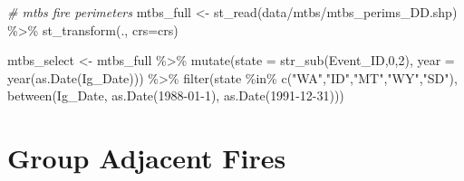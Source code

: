 \documentclass[
]{book}
\newenvironment{Shaded}{\begin{snugshade}}{\end{snugshade}}
\newcommand{\AttributeTok}[1]{\textcolor[rgb]{0.77,0.63,0.00}{#1}}
\newcommand{\CommentTok}[1]{\textcolor[rgb]{0.56,0.35,0.01}{\textit{#1}}}
\newcommand{\DecValTok}[1]{\textcolor[rgb]{0.00,0.00,0.81}{#1}}
\newcommand{\FunctionTok}[1]{\textcolor[rgb]{0.00,0.00,0.00}{#1}}
\newcommand{\NormalTok}[1]{#1}
\newcommand{\OtherTok}[1]{\textcolor[rgb]{0.56,0.35,0.01}{#1}}
\newcommand{\SpecialCharTok}[1]{\textcolor[rgb]{0.00,0.00,0.00}{#1}}
\newcommand{\StringTok}[1]{\textcolor[rgb]{0.31,0.60,0.02}{#1}}
\begin{document}
\begin{Shaded}
\begin{Highlighting}[]
\CommentTok{\# mtbs fire perimeters}
\NormalTok{mtbs\_full }\OtherTok{\textless{}{-}} \FunctionTok{st\_read}\NormalTok{(}\StringTok{\textquotesingle{}data/mtbs/mtbs\_perims\_DD.shp\textquotesingle{}}\NormalTok{) }\SpecialCharTok{\%\textgreater{}\%} 
  \FunctionTok{st\_transform}\NormalTok{(., }\AttributeTok{crs=}\NormalTok{crs)}

\NormalTok{mtbs\_select }\OtherTok{\textless{}{-}}\NormalTok{ mtbs\_full }\SpecialCharTok{\%\textgreater{}\%} 
  \FunctionTok{mutate}\NormalTok{(}\AttributeTok{state =} \FunctionTok{str\_sub}\NormalTok{(Event\_ID,}\DecValTok{0}\NormalTok{,}\DecValTok{2}\NormalTok{),}
         \AttributeTok{year =} \FunctionTok{year}\NormalTok{(}\FunctionTok{as.Date}\NormalTok{(Ig\_Date))) }\SpecialCharTok{\%\textgreater{}\%} 
  \FunctionTok{filter}\NormalTok{(state }\SpecialCharTok{\%in\%} \FunctionTok{c}\NormalTok{(}\StringTok{"WA"}\NormalTok{,}\StringTok{"ID"}\NormalTok{,}\StringTok{"MT"}\NormalTok{,}\StringTok{"WY"}\NormalTok{,}\StringTok{"SD"}\NormalTok{),}
         \FunctionTok{between}\NormalTok{(Ig\_Date, }\FunctionTok{as.Date}\NormalTok{(}\StringTok{\textquotesingle{}1988{-}01{-}1\textquotesingle{}}\NormalTok{), }\FunctionTok{as.Date}\NormalTok{(}\StringTok{\textquotesingle{}1991{-}12{-}31\textquotesingle{}}\NormalTok{))) }
\end{Highlighting}
\end{Shaded}

\hypertarget{group-adjacent-fires}{%
\section{Group Adjacent Fires}\label{group-adjacent-fires}}
\end{document}
